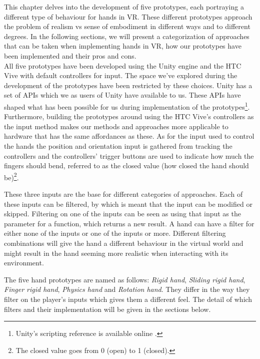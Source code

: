 This chapter delves into the development of five prototypes, each portraying a different type of behaviour for hands in VR. These different prototypes approach the problem of realism vs sense of embodiment in different ways and to different degrees. In the following sections, we will present a categorization of approaches that can be taken when implementing hands in VR, how our prototypes have been implemented and their pros and cons.\\

All five prototypes have been developed using the Unity engine and the HTC Vive with default controllers for input. The space we've explored during the development of the prototypes have been restricted by these choices. Unity has a set of APIs which we as users of Unity have available to us. These APIs have shaped what has been possible for us during implementation of the prototypes\footnote{Unity's scripting reference is available online \parencite{UnityScriptingReference2017}.}. Furthermore, building the prototypes around using the HTC Vive's controllers as the input method makes our methods and approaches more applicable to hardware that has the same affordances as these. As for the input used to control the hands the position and orientation input is gathered from tracking the controllers and the controllers' trigger buttons are used to indicate how much the fingers should bend, referred to as the closed value (how closed the hand should be)\footnote{The closed value goes from 0 (open) to 1 (closed).}.

These three inputs are the base for different categories of approaches. Each of these inputs can be filtered, by which is meant that the input can be modified or skipped. Filtering on one of the inputs can be seen as using that input as the parameter for a function, which returns a new result. A hand can have a filter for either none of the inputs or one of the inputs or more. Different filtering combinations will give the hand a different behaviour in the virtual world and might result in the hand seeming more realistic when interacting with its environment.

The five hand prototypes are named as follows: \textit{Rigid hand}, \textit{Sliding rigid hand}, \textit{Finger rigid hand}, \textit{Physics hand} and \textit{Rotation hand}. They differ in the way they filter on the player's inputs which gives them a different feel. The detail of which filters and their implementation will be given in the sections below.

